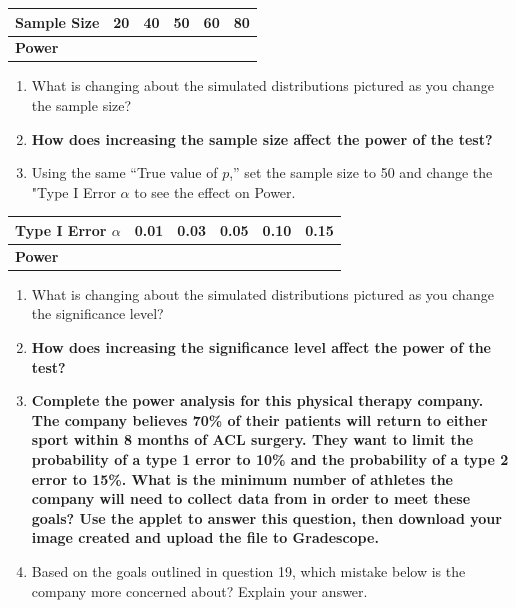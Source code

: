 \documentclass[
]{report}
\begin{document}
\setlength\tabcolsep{0.6cm}
\begin{longtable}{|l|c|c|c|c|c|}
\hline
\textbf{Sample Size}& 20 & 40 & 50 & 60 & 80 \\ \hline
\textbf{Power} & & & & &  \\ \hline
\end{longtable}

\begin{enumerate}
\def\labelenumi{\arabic{enumi}.}
\setcounter{enumi}{13}
\item
  What is changing about the simulated distributions pictured as you change the sample size?
  \vspace{0.5in}
\item
  \textbf{How does increasing the sample size affect the power of the test?}
  \vspace{0.5in}
\item
  Using the same ``True value of \(p\),'' set the sample size to 50 and change the "Type I Error \(\alpha\) to see the effect on Power.
\end{enumerate}

\setlength\tabcolsep{0.5cm}
\begin{longtable}{|l|c|c|c|c|c|}
\hline
\textbf{Type I Error $\alpha$}& 0.01 & 0.03 & 0.05 & 0.10 & 0.15 \\ \hline
\textbf{Power} & & & & &  \\ \hline
\end{longtable}

\begin{enumerate}
\def\labelenumi{\arabic{enumi}.}
\setcounter{enumi}{16}
\item
  What is changing about the simulated distributions pictured as you change the significance level?
  \vspace{0.5in}
\item
  \textbf{How does increasing the significance level affect the power of the test?}
  \vspace{0.5in}
\item
  \textbf{Complete the power analysis for this physical therapy company. The company believes 70\% of their patients will return to either sport within 8 months of ACL surgery. They want to limit the probability of a type 1 error to 10\% and the probability of a type 2 error to 15\%. What is the minimum number of athletes the company will need to collect data from in order to meet these goals? Use the applet to answer this question, then download your image created and upload the file to Gradescope.}
  \vspace{0.25in}
\item
  Based on the goals outlined in question 19, which mistake below is the company more concerned about? Explain your answer.
\end{enumerate}
\end{document}
